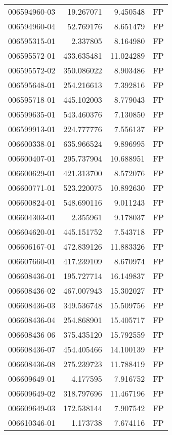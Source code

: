 \begin{tabular}{lrrl}
006594960-03 &   19.267071 &     9.450548 &   FP \\
006594960-04 &   52.769176 &     8.651479 &   FP \\
006595315-01 &    2.337805 &     8.164980 &   FP \\
006595572-01 &  433.635481 &    11.024289 &   FP \\
006595572-02 &  350.086022 &     8.903486 &   FP \\
006595648-01 &  254.216613 &     7.392816 &   FP \\
006595718-01 &  445.102003 &     8.779043 &   FP \\
006599635-01 &  543.460376 &     7.130850 &   FP \\
006599913-01 &  224.777776 &     7.556137 &   FP \\
006600338-01 &  635.966524 &     9.896995 &   FP \\
006600407-01 &  295.737904 &    10.688951 &   FP \\
006600629-01 &  421.313700 &     8.572076 &   FP \\
006600771-01 &  523.220075 &    10.892630 &   FP \\
006600824-01 &  548.690116 &     9.011243 &   FP \\
006604303-01 &    2.355961 &     9.178037 &   FP \\
006604620-01 &  445.151752 &     7.543718 &   FP \\
006606167-01 &  472.839126 &    11.883326 &   FP \\
006607660-01 &  417.239109 &     8.670974 &   FP \\
006608436-01 &  195.727714 &    16.149837 &   FP \\
006608436-02 &  467.007943 &    15.302027 &   FP \\
006608436-03 &  349.536748 &    15.509756 &   FP \\
006608436-04 &  254.868901 &    15.405717 &   FP \\
006608436-06 &  375.435120 &    15.792559 &   FP \\
006608436-07 &  454.405466 &    14.100139 &   FP \\
006608436-08 &  275.239723 &    11.788419 &   FP \\
006609649-01 &    4.177595 &     7.916752 &   FP \\
006609649-02 &  318.797696 &    11.467196 &   FP \\
006609649-03 &  172.538144 &     7.907542 &   FP \\
006610346-01 &    1.173738 &     7.674116 &   FP \\

\end{tabular}
